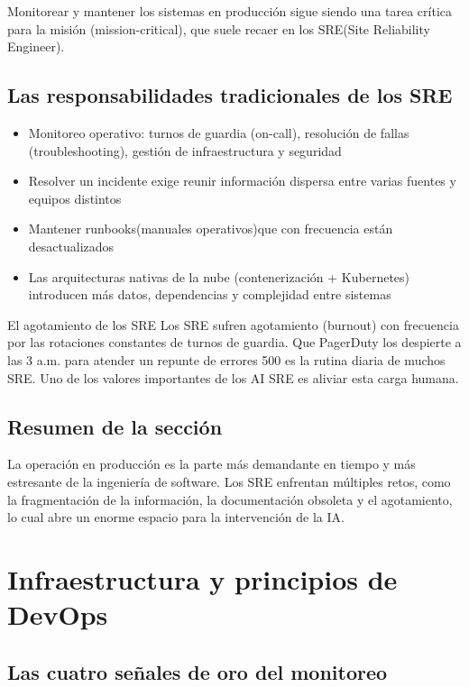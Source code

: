 \documentclass[a4paper]{article}
\begin{document}
Monitorear y mantener los sistemas en producción sigue siendo una tarea crítica para la misión (mission-critical), que suele recaer en los SRE(Site Reliability Engineer).

\subsection{Las responsabilidades tradicionales de los SRE}

\begin{itemize}
    \item Monitoreo operativo: turnos de guardia (on-call), resolución de fallas (troubleshooting), gestión de infraestructura y seguridad
    \item Resolver un incidente exige reunir información dispersa entre varias fuentes y equipos distintos
    \item Mantener runbooks(manuales operativos)que con frecuencia están desactualizados
    \item Las arquitecturas nativas de la nube (contenerización + Kubernetes) introducen más datos, dependencias y complejidad entre sistemas
\end{itemize}

\begin{warningbox}{El agotamiento de los SRE}
Los SRE sufren agotamiento (burnout) con frecuencia por las rotaciones constantes de turnos de guardia. Que PagerDuty los despierte a las 3 a.m. para atender un repunte de errores 500 es la rutina diaria de muchos SRE. Uno de los valores importantes de los AI SRE es aliviar esta carga humana.
\end{warningbox}

\subsection{Resumen de la sección}

La operación en producción es la parte más demandante en tiempo y más estresante de la ingeniería de software. Los SRE enfrentan múltiples retos, como la fragmentación de la información, la documentación obsoleta y el agotamiento, lo cual abre un enorme espacio para la intervención de la IA.

\section{Infraestructura y principios de DevOps}

\subsection{Las cuatro señales de oro del monitoreo}
\end{document}
